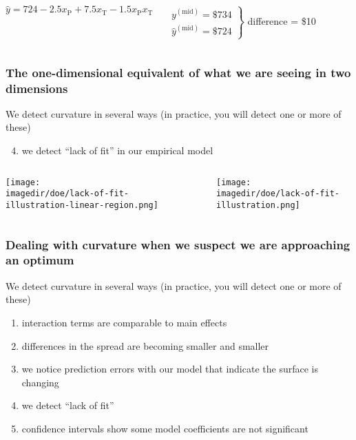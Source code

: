 \begin{frame}
\begin{columns}[T]
{				\vspace{0.4cm}
				\scriptsize
				$\hat{y} = 724  -2.5 x_\text{P} +  7.5 x_\text{T} -1.5 x_\text{P}x_\text{T} $
				\normalsize
				
				\vspace{0.2cm}
				
				$\left.\begin{array}{c}
					y^{(\text{mid})} = \$ 734\\
					\hat{y}^{(\text{mid})} = \$ 724
				\end{array}\right\}$ {\scriptsize difference = \$10}
			}
	\end{columns}
\end{frame}

\begin{frame}\frametitle{The one-dimensional equivalent of what we are seeing in two dimensions}
	
	{\color{myOrange}We detect curvature in several ways (in practice, you will detect one or more of these)}
	
	\vspace{.7cm}
	\begin{enumerate}\setcounter{enumi}{3}
		\item	we detect ``lack of fit'' in our empirical model
	\end{enumerate}
	
	\begin{columns}[T]
			\centerline{\texttt{[image: \\imagedir/doe/lack-of-fit-illustration-linear-region.png]}}
			\rule[3mm]{0.01cm}{60mm}%
			\centerline{\texttt{[image: \\imagedir/doe/lack-of-fit-illustration.png]}}
	\end{columns}	
\end{frame}

\begin{frame}\frametitle{Dealing with curvature when we suspect we are approaching an optimum}
	{\color{myOrange}We detect curvature in several ways (in practice, you will detect one or more of these)}
	
	\vspace{.7cm}
	\begin{enumerate}
		\item	interaction terms are comparable to main effects
		\item	differences in the spread are becoming smaller and smaller
		\item	we notice prediction errors with our model that indicate the surface is changing
		\item	we detect ``lack of fit''
		\item	confidence intervals show some model coefficients are not significant
	\end{enumerate}
	
\end{frame}

